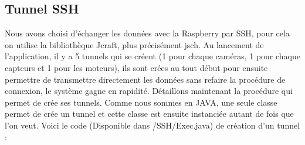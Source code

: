 \documentclass[a4paper,11pt]{report}
\begin{document}
		\subsection{Tunnel SSH}
			Nous avons choisi d'échanger les données avec la Raspberry par SSH, pour cela on utilise la bibliothèque Jcraft, plus précisément jsch. Au lancement de l'application, il y a 5 tunnels qui se créent (1 pour chaque caméras, 1 pour chaque capteurs et 1 pour les moteurs), ils sont crées au tout début pour ensuite permettre de transmettre directement les données sans refaire la procédure de connexion, le système gagne en rapidité. 
			\newline Détaillons maintenant la procédure qui permet de crée ses tunnels. Comme nous sommes en JAVA, une seule classe permet de crée un tunnel et cette classe est ensuite instanciée autant de fois que l'on veut.
			\newline Voici le code (Disponible dans /SSH/Exec.java) de création d'un tunnel :
			
\end{document}

